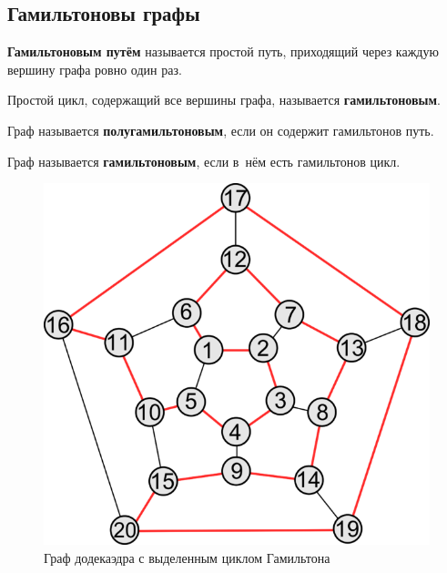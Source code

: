 \subsection{Гамильтоновы графы}
\textbf{Гамильтоновым путём} называется простой путь, приходящий через каждую вершину графа ровно один раз.

Простой цикл, содержащий все вершины графа, называется \textbf{гамильтоновым}.

Граф называется \textbf{полугамильтоновым}, если он содержит гамильтонов путь.

Граф называется \textbf{гамильтоновым}, если в~нём есть гамильтонов цикл.

\begin{figure}[h!]
	\begin{center}
		\includegraphics[scale=1.5]{./mh/discrete_mathematics/graph/EH/hamiltonian_graphs/641px-Hamiltonial.png}
	\end{center}
	\caption{Граф додекаэдра с выделенным циклом Гамильтона}
\end{figure}

